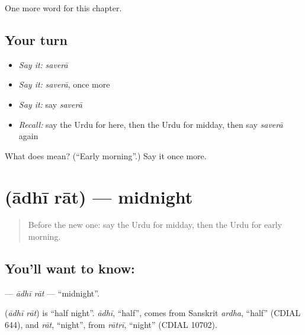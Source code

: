 \begin{grammarlens}[title={What you've built}]
One more word for this chapter.
\end{grammarlens}

\subsection*{Your turn}
\begin{itemize}
\raggedright
  \item \emph{Say it:} \emph{saverā}
  \item \emph{Say it:} \emph{saverā}, once more
  \item \emph{Say it:} say \emph{saverā}
  \item \emph{Recall:} say the Urdu for here, then the Urdu for midday, then say \emph{saverā} again
\end{itemize}

\begin{tcolorbox}[breakable,colback=teal!4,colframe=teal!35!black,title={Before you move on}]
What does  mean? (\textquotedblleft{}Early morning\textquotedblright{}.) Say it once more.
\end{tcolorbox}
\section[\texorpdfstring{\ur{آدھی} \ur{رات} (ādhī rāt)}{آدھی رات (ādhī rāt)}]{  (ādhī rāt) — midnight}

\label{lesson:UR-C91-adhirat}



\begin{quote}
Before the new one: say the Urdu for midday, then the Urdu for early morning.
\end{quote}

\subsection*{You'll want to know:  }
\textbf{ } — \emph{ādhī rāt} — \textquotedblleft{}midnight\textquotedblright{}.

\begin{cousinweb}
\textbf{ } (\emph{ādhī rāt}) is \textquotedblleft{}half night\textquotedblright{}. \emph{ādhī}, \textquotedblleft{}half\textquotedblright{}, comes from Sanskrit \emph{ardha}, \textquotedblleft{}half\textquotedblright{} (CDIAL 644), and \emph{rāt}, \textquotedblleft{}night\textquotedblright{}, from \emph{rātrī}, \textquotedblleft{}night\textquotedblright{} (CDIAL 10702).
\end{cousinweb}

